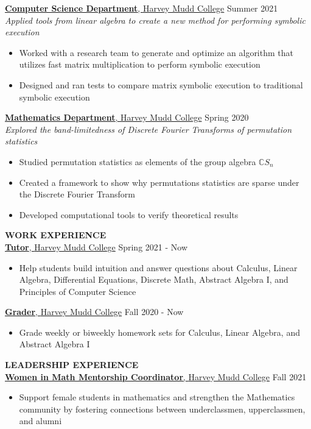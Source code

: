 \documentclass[11pt]{article}
\newcommand{\hdr}[1]{\textcolor{blue(ryb)}{\textbf{#1}}}
\newcommand{\role}[3]{\underline{\textbf{#1}, {#2}} \hfill #3}
\begin{document}
\smallskip
\role{Computer Science Department}{Harvey Mudd College}{Summer 2021}\\
\textit{Applied tools from linear algebra to create a new method for performing symbolic execution}\\
\begin{itemize}
\item Worked with a research team to generate and optimize an algorithm that utilizes fast matrix multiplication to perform symbolic execution\\
\item Designed and ran tests to compare matrix symbolic execution to traditional symbolic execution
\end{itemize}
\smallskip
\role{Mathematics Department}{Harvey Mudd College}{Spring 2020}\\
\textit{Explored the band-limitedness of Discrete Fourier Transforms of permutation statistics}\\
\begin{itemize}
  \item Studied permutation statistics as elements of the group algebra $\mathbb{C} S_n$
  \item Created a framework to show why permutations statistics are sparse under the Discrete Fourier Transform
  \item Developed computational tools to verify theoretical results
\end{itemize}
\medskip
\hdr{WORK EXPERIENCE}\\
\role{Tutor}{Harvey Mudd College}{Spring 2021 - Now}
\begin{itemize}
\item Help students build intuition and answer questions about Calculus, Linear Algebra, Differential Equations, Discrete Math, Abstract Algebra I, and Principles of Computer Science
\end{itemize}
\smallskip
\role{Grader}{Harvey Mudd College}{Fall 2020 - Now}\\
\begin{itemize}
\item Grade weekly or biweekly homework sets for Calculus, Linear Algebra, and Abstract Algebra I
\end{itemize}
\newpage
\hdr{LEADERSHIP EXPERIENCE}\\
\role{Women in Math Mentorship Coordinator}{Harvey Mudd College}{Fall 2021}
\begin{itemize}
\item Support female students in mathematics and strengthen the Mathematics community by fostering connections between underclassmen, upperclassmen, and alumni
\end{itemize}
\end{document}
